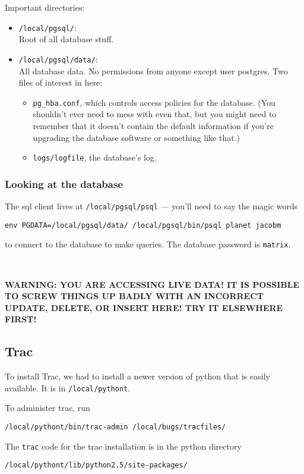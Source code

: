 \documentclass{article}
\begin{document}
Important directories: 
\begin{itemize}
\item \texttt{/local/pgsql/}: \\
Root of all database stuff.

\item \texttt{/local/pgsql/data/}: \\
All database data. No permissions from anyone
except user postgres. Two files of interest in here:
\begin{itemize}
  \item \texttt{pg\_hba.conf}, which controls access policies for
  the database. (You shouldn't ever need to mess with even that, but
  you might need to remember that it doesn't contain the default
  information if you're upgrading the database software or something
  like that.)
  \item \texttt{logs/logfile}, the database's log. 
\end{itemize}
\end{itemize}

\subsubsection{Looking at the database}

The sql client lives at \texttt{/local/pgsql/psql} --- you'll need to
say the magic words 
\begin{center}
\tt env PGDATA=/local/pgsql/data/ /local/pgsql/bin/psql planet jacobm
\end{center}
to connect to the database to make queries. The database password is \texttt{matrix}.

~

\textbf{WARNING: YOU ARE ACCESSING LIVE DATA! IT IS POSSIBLE
TO SCREW THINGS UP BADLY WITH AN INCORRECT UPDATE, DELETE, OR INSERT
HERE! TRY IT ELSEWHERE FIRST!}

\subsection{Trac}

To install Trac, we had to install a newer version of python that is easily available. It is in \texttt{/local/pythont}.

To administer trac, run
\begin{center}
\texttt{/local/pythont/bin/trac-admin /local/bugs/tracfiles/}
\end{center}

The \texttt{trac} code for the trac installation is in the python directory
\begin{center}
 \texttt{/local/pythont/lib/python2.5/site-packages/}
\end{center}
\end{document}
